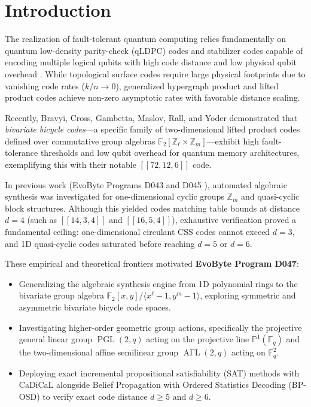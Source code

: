 \documentclass[11pt,a4paper]{article}
\begin{document}
\section{Introduction}
\label{sec:intro}
The realization of fault-tolerant quantum computing relies fundamentally on quantum low-density parity-check (qLDPC) codes and stabilizer codes capable of encoding multiple logical qubits with high code distance and low physical qubit overhead \cite{gottesman1996stabilizer, steane1996error, shor1995scheme, calderbank1996good, calderbank1998quantum}. While topological surface codes require large physical footprints due to vanishing code rates ($k/n \to 0$), generalized hypergraph product and lifted product codes \cite{tillich2014quantum, kovalev2013quantum, panteleev2022asymptotically} achieve non-zero asymptotic rates with favorable distance scaling.

Recently, Bravyi, Cross, Gambetta, Maslov, Rall, and Yoder \cite{bravyi2024bivariate} demonstrated that \emph{bivariate bicycle codes}---a specific family of two-dimensional lifted product codes defined over commutative group algebras $\mathbb{F}_2[\mathbb{Z}_\ell \times \mathbb{Z}_m]$---exhibit high fault-tolerance thresholds and low qubit overhead for quantum memory architectures, exemplifying this with their notable $[[72, 12, 6]]$ code.

In previous work (EvoByte Programs D043 and D045 \cite{zanata2026structured, zanata2026generalized}), automated algebraic synthesis was investigated for one-dimensional cyclic groups $\mathbb{Z}_m$ and quasi-cyclic block structures. Although this yielded codes matching table bounds at distance $d=4$ (such as $[[14, 3, 4]]$ and $[[16, 5, 4]]$), exhaustive verification proved a fundamental ceiling: one-dimensional circulant CSS codes cannot exceed $d=3$, and 1D quasi-cyclic codes saturated before reaching $d=5$ or $d=6$.

These empirical and theoretical frontiers motivated \textbf{EvoByte Program D047}:
\begin{itemize}
    \item Generalizing the algebraic synthesis engine from 1D polynomial rings to the bivariate group algebra $\mathbb{F}_2[x, y] / \langle x^\ell - 1, y^m - 1 \rangle$, exploring symmetric and asymmetric bivariate bicycle code spaces.
    \item Investigating higher-order geometric group actions, specifically the projective general linear group $\operatorname{PGL}(2, q)$ acting on the projective line $\mathbb{P}^1(\mathbb{F}_q)$ and the two-dimensional affine semilinear group $\operatorname{A\Gamma L}(2, q)$ acting on $\mathbb{F}_q^2$.
    \item Deploying exact incremental propositional satisfiability (SAT) methods with CaDiCaL \cite{biere2020cadical, ignatiev2018pysat} alongside Belief Propagation with Ordered Statistics Decoding (BP-OSD) to verify exact code distance $d \ge 5$ and $d \ge 6$.
\end{itemize}
\end{document}
